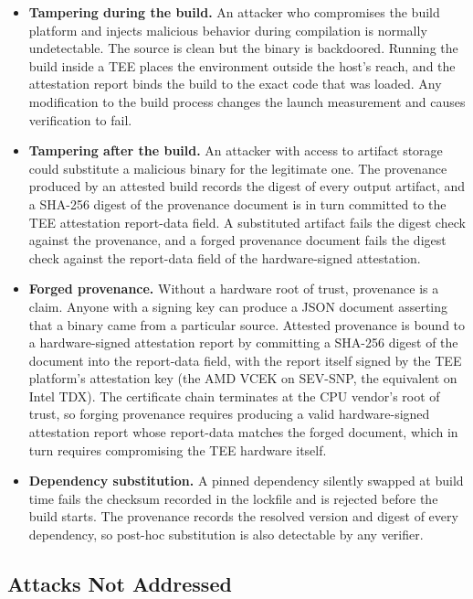 \documentclass[11pt]{article}
\begin{document}
\begin{itemize}
\item \textbf{Tampering during the build.} An attacker who compromises the build platform and injects malicious behavior during compilation is normally undetectable. The source is clean but the binary is backdoored. Running the build inside a TEE places the environment outside the host's reach, and the attestation report binds the build to the exact code that was loaded. Any modification to the build process changes the launch measurement and causes verification to fail.
\item \textbf{Tampering after the build.} An attacker with access to artifact storage could substitute a malicious binary for the legitimate one. The provenance produced by an attested build records the digest of every output artifact, and a SHA-256 digest of the provenance document is in turn committed to the TEE attestation report-data field. A substituted artifact fails the digest check against the provenance, and a forged provenance document fails the digest check against the report-data field of the hardware-signed attestation.
\item \textbf{Forged provenance.} Without a hardware root of trust, provenance is a claim. Anyone with a signing key can produce a JSON document asserting that a binary came from a particular source. Attested provenance is bound to a hardware-signed attestation report by committing a SHA-256 digest of the document into the report-data field, with the report itself signed by the TEE platform's attestation key (the AMD VCEK on SEV-SNP, the equivalent on Intel TDX). The certificate chain terminates at the CPU vendor's root of trust, so forging provenance requires producing a valid hardware-signed attestation report whose report-data matches the forged document, which in turn requires compromising the TEE hardware itself.
\item \textbf{Dependency substitution.} A pinned dependency silently swapped at build time fails the checksum recorded in the lockfile and is rejected before the build starts. The provenance records the resolved version and digest of every dependency, so post-hoc substitution is also detectable by any verifier.
\end{itemize}

\subsection{Attacks Not Addressed}
\end{document}
